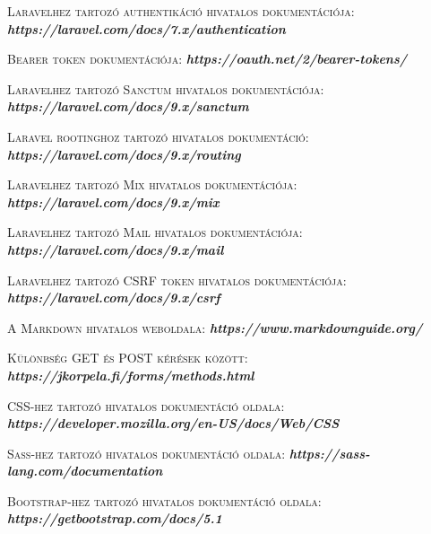 \documentclass[
]{thesis-ekf}
\theoremstyle{definition}
\theoremstyle{remark}
\begin{document}
\begin{thebibliography}{2}
\textsc{Laravelhez tartozó authentikáció hivatalos dokumentációja:}
\newline
\emph{\bf{https://laravel.com/docs/7.x/authentication}}

\textsc{Bearer token dokumentációja:}
\newline
\emph{\bf{https://oauth.net/2/bearer-tokens/}}

\textsc{Laravelhez tartozó Sanctum hivatalos dokumentációja:}
\newline
\emph{\bf{https://laravel.com/docs/9.x/sanctum}}

\textsc{Laravel rootinghoz tartozó hivatalos dokumentáció:}
\newline
\emph{\bf{https://laravel.com/docs/9.x/routing}}

\textsc{Laravelhez tartozó Mix hivatalos dokumentációja:}
\newline
\emph{\bf{https://laravel.com/docs/9.x/mix}}

\textsc{Laravelhez tartozó Mail hivatalos dokumentációja:}
\newline
\emph{\bf{https://laravel.com/docs/9.x/mail}}

\textsc{Laravelhez tartozó CSRF token hivatalos dokumentációja:}
\newline
\emph{\bf{https://laravel.com/docs/9.x/csrf}}

\textsc{A Markdown hivatalos weboldala:}
\newline
\emph{\bf{https://www.markdownguide.org/}}

\textsc{Különbség GET és POST kérések között:}
\newline
\emph{\bf{https://jkorpela.fi/forms/methods.html}}

\textsc{CSS-hez tartozó hivatalos dokumentáció oldala:}
\newline
\emph{\bf{https://developer.mozilla.org/en-US/docs/Web/CSS}}

\textsc{Sass-hez tartozó hivatalos dokumentáció oldala:}
\newline
\emph{\bf{https://sass-lang.com/documentation}}

\textsc{Bootstrap-hez tartozó hivatalos dokumentáció oldala:}
\newline
\emph{\bf{https://getbootstrap.com/docs/5.1}}


\end{thebibliography}
\end{document}
